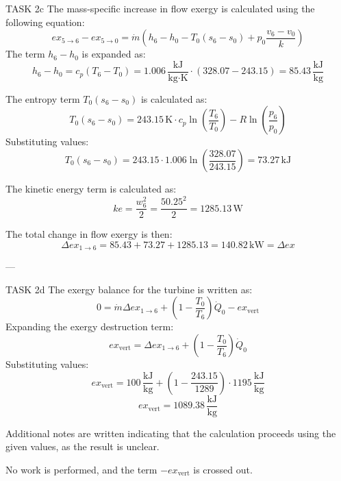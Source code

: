TASK 2c  
The mass-specific increase in flow exergy is calculated using the following equation:  
\[
ex_{5 \to 6} - ex_{5 \to 0} = \dot{m} \left( h_6 - h_0 - T_0 (s_6 - s_0) + p_0 \frac{v_6 - v_0}{k} \right)
\]  
The term \( h_6 - h_0 \) is expanded as:  
\[
h_6 - h_0 = c_p \left( T_6 - T_0 \right) = 1.006 \, \frac{\text{kJ}}{\text{kg·K}} \cdot (328.07 - 243.15) = 85.43 \, \frac{\text{kJ}}{\text{kg}}
\]  

The entropy term \( T_0 (s_6 - s_0) \) is calculated as:  
\[
T_0 (s_6 - s_0) = 243.15 \, \text{K} \cdot c_p \ln \left( \frac{T_6}{T_0} \right) - R \ln \left( \frac{p_6}{p_0} \right)
\]  
Substituting values:  
\[
T_0 (s_6 - s_0) = 243.15 \cdot 1.006 \ln \left( \frac{328.07}{243.15} \right) = 73.27 \, \text{kJ}
\]  

The kinetic energy term is calculated as:  
\[
ke = \frac{w_6^2}{2} = \frac{50.25^2}{2} = 1285.13 \, \text{W}
\]  

The total change in flow exergy is then:  
\[
\Delta ex_{1 \to 6} = 85.43 + 73.27 + 1285.13 = 140.82 \, \text{kW} = \Delta ex
\]  

---

TASK 2d  
The exergy balance for the turbine is written as:  
\[
0 = \dot{m} \Delta ex_{1 \to 6} + \left( 1 - \frac{T_0}{T_6} \right) \dot{Q}_0 - ex_{\text{vert}}
\]  
Expanding the exergy destruction term:  
\[
ex_{\text{vert}} = \Delta ex_{1 \to 6} + \left( 1 - \frac{T_0}{T_6} \right) \dot{Q}_0
\]  
Substituting values:  
\[
ex_{\text{vert}} = 100 \, \frac{\text{kJ}}{\text{kg}} + \left( 1 - \frac{243.15}{1289} \right) \cdot 1195 \, \frac{\text{kJ}}{\text{kg}}
\]  
\[
ex_{\text{vert}} = 1089.38 \, \frac{\text{kJ}}{\text{kg}}
\]  

Additional notes are written indicating that the calculation proceeds using the given values, as the result is unclear.  

No work is performed, and the term \( -ex_{\text{vert}} \) is crossed out.